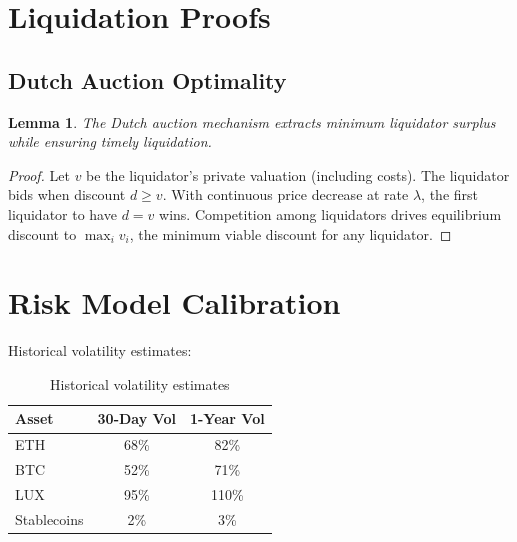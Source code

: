 \documentclass[11pt,a4paper]{article}
\newtheorem{lemma}[theorem]{Lemma}
\begin{document}
\section{Liquidation Proofs}

\subsection{Dutch Auction Optimality}

\begin{lemma}
The Dutch auction mechanism extracts minimum liquidator surplus while ensuring timely liquidation.
\end{lemma}

\begin{proof}
Let $v$ be the liquidator's private valuation (including costs). The liquidator bids when discount $d \geq v$. With continuous price decrease at rate $\lambda$, the first liquidator to have $d = v$ wins. Competition among liquidators drives equilibrium discount to $\max_i v_i$, the minimum viable discount for any liquidator.
\end{proof}

\section{Risk Model Calibration}

Historical volatility estimates:
\begin{table}[h]
\centering
\begin{tabular}{@{}lcc@{}}
\toprule
Asset & 30-Day Vol & 1-Year Vol \\
\midrule
ETH & 68\% & 82\% \\
BTC & 52\% & 71\% \\
LUX & 95\% & 110\% \\
Stablecoins & 2\% & 3\% \\
\bottomrule
\end{tabular}
\caption{Historical volatility estimates}
\end{table}
\end{document}
